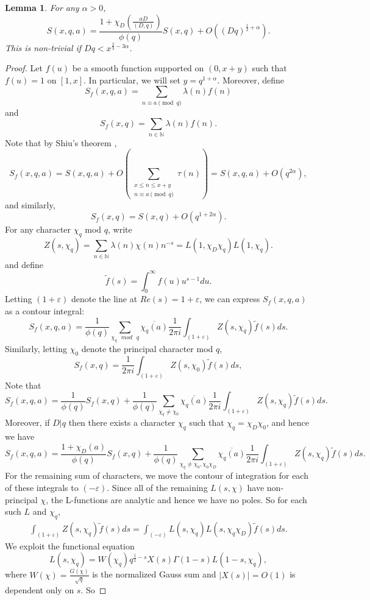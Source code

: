 \documentclass{amsart}
\newtheorem{lemma}[theorem]{Lemma}
\begin{document}
\begin{lemma}\label{lambdaap} For any $\alpha>0$,
$$S(x,q,a)=\frac{1+\chi_D\left(\frac{aD}{(D,q)}\right)}{\phi(q)}S(x,q)+O\left((Dq)^{\frac 12+\alpha}\right).$$
This is non-trivial if $Dq<x^{\frac 23-3\alpha}$.
\end{lemma}
\begin{proof}
Let $f(u)$ be a smooth function supported on $(0,x+y)$ such that $f(u)=1$ on $[1,x]$.  In particular, we will set $y=q^{1+\alpha}$. Moreover, define
$$S_f(x,q,a)=\sum_{n\equiv a \pmod q}\lambda(n)f(n)$$
and
$$S_f(x,q)=\sum_{n\in \mathbb N}\lambda(n)f(n).$$
Note that by Shiu's theorem \cite{Sh},
$$S_f(x,q,a)=S(x,q,a)+O\left(\sum_{\substack{x\leq n\leq x+y \\ n\equiv a \pmod q}}\tau(n)\right)=S(x,q,a)+O\left(q^{2\alpha}\right),$$
and similarly,
$$S_f(x,q)=S(x,q)+O\left(q^{1+2\alpha}\right).$$
For any character $\chi_q$ mod $q$, write
$$Z(s,\chi_q)=\sum_{n\in \mathbb N}\lambda(n)\chi(n)n^{-s}=L(1,\chi_D\chi_q)L(1,\chi_q).$$
and define
$$\tilde{f}(s)=\int_0^\infty f(u)u^{s-1}du.$$
Letting $(1+\varepsilon)$ denote the line at $Re(s)=1+\varepsilon$, we can express $S_f(x,q,a)$ as a contour integral:
$$S_f(x,q,a)=\frac{1}{\phi(q)}\sum_{\chi_q\mbox{ }mod\mbox{ }q}\overline{\chi_q(a)}\frac{1}{2\pi i}\int_{(1+\varepsilon)}Z(s,\chi_q)\tilde{f}(s)ds.$$
Similarly, letting $\chi_0$ denote the principal character mod $q$,
$$S_f(x,q)=\frac{1}{2\pi i}\int_{(1+\varepsilon)}Z(s,\chi_0)\tilde{f}(s)ds,$$
Note that
$$S_f(x,q,a)=\frac{1}{\phi(q)}S_f(x,q)+\frac{1}{\phi(q)}\sum_{\chi_q\neq \chi_0}\overline{\chi_q(a)}\frac{1}{2\pi i}\int_{(1+\varepsilon)}Z(s,\chi_q)\tilde{f}(s)ds.$$
Moreover, if $D|q$ then there exists a character $\chi_q$ such that $\chi_q=\chi_D\chi_0$, and hence we have
$$S_f(x,q,a)=\frac{1+\chi_D(a)}{\phi(q)}S_f(x,q)+\frac{1}{\phi(q)}\sum_{\chi_q\neq \chi_0,\chi_0\chi_D}\overline{\chi_q(a)}\frac{1}{2\pi i}\int_{(1+\varepsilon)}Z(s,\chi_q)\tilde{f}(s)ds.$$
For the remaining sum of characters, we move the contour of integration for each of these integrals to $(-\varepsilon)$.  Since all of the remaining $L(s,\chi)$ have non-principal $\chi$, the L-functions are analytic and hence we have no poles.  So for each such $L$ and $\chi_q$,
\begin{align*}\int_{(1+\varepsilon)}Z(s,\chi_q)\tilde{f}(s)ds= \int_{(-\varepsilon)}L(s,\chi_q)L(s,\chi_q\chi_D)\tilde{f}(s)ds.\end{align*}
We exploit the functional equation
$$L(s,\chi_q)=W(\chi_q)q^{\frac 12-s}X(s)\Gamma(1-s)L(1-s,\chi_q),$$
where  $W(\chi)=\frac{G(\chi)}{\sqrt q}$ is the normalized Gauss sum and $|X(s)|=O(1)$ is dependent only on $s$.  So

\end{proof}
\end{document}
